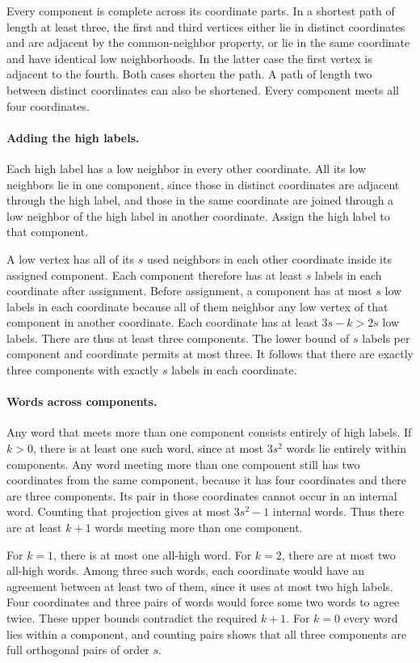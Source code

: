 \documentclass[11pt]{article}
\begin{document}
Every component is complete across its coordinate parts. In a
shortest path of length at least three, the first and third vertices
either lie in distinct coordinates and are adjacent by the
common-neighbor property, or lie in the same coordinate and have
identical low neighborhoods. In the latter case the first vertex
is adjacent to the fourth. Both cases shorten the path. A path of
length two between distinct coordinates can also be shortened.
Every component meets all four coordinates.

\paragraph{Adding the high labels.}
Each high label has a low neighbor in every other coordinate.
All its low neighbors lie in one component, since those in distinct
coordinates are adjacent through the high label, and those in the
same coordinate are joined through a low neighbor of the high label
in another coordinate. Assign
the high label to that component.

A low vertex has all of its \(s\) used neighbors in each other
coordinate inside its assigned component. Each component therefore
has at least \(s\) labels in each coordinate after assignment.
Before assignment, a component has at most \(s\) low labels in
each coordinate because all of them neighbor any low vertex of
that component in another coordinate. Each coordinate has at least
\(3s-k>2s\) low labels. There are thus at least three components.
The lower bound of \(s\) labels per component and coordinate permits
at most three. It follows that there are exactly three components
with exactly \(s\) labels in each coordinate.

\paragraph{Words across components.}
Any word that meets more than one component consists entirely of
high labels. If \(k>0\), there is at least one such word, since at most
\(3s^2\) words lie entirely within components. Any word meeting more
than one component still has two coordinates from the same component,
because it has four coordinates and there are three components.
Its pair in those coordinates cannot occur in an internal word.
Counting that projection gives at most \(3s^2-1\) internal words.
Thus there are at least \(k+1\) words meeting more than one component.

For \(k=1\), there is at most one all-high word. For \(k=2\), there
are at most two all-high words. Among three such words, each coordinate
would have an agreement between at least two of them, since it uses
at most two high labels. Four coordinates and three pairs of words
would force some two words to agree twice. These upper bounds
contradict the required \(k+1\). For \(k=0\) every word lies within
a component, and counting pairs shows that all three components are
full orthogonal pairs of order \(s\).
\end{document}
